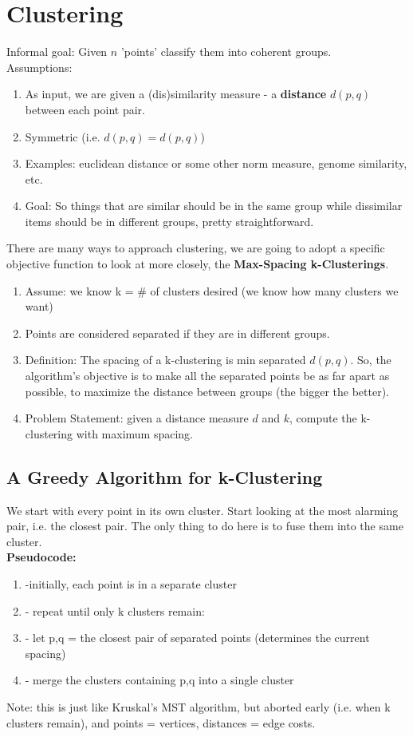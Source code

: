 \documentclass{article}
\begin{document}
\section{Clustering}
Informal goal: Given $n$ 'points' classify them into coherent groups.
\\ 
Assumptions: 
\
\begin{enumerate}
\item As input, we are given a (dis)similarity measure - a \textbf{distance} $d(p,q)$ between each point pair.
\item Symmetric (i.e. $d(p,q) = d(p,q)$)
\item Examples: euclidean distance or some other norm measure, genome similarity, etc.
\item Goal: So things that are similar should be in the same group while dissimilar items should be in different groups, pretty 
straightforward.
\end{enumerate}
There are many ways to approach clustering, we are going to adopt a specific objective function to look at more closely, the 
\textbf{Max-Spacing k-Clusterings}.
\
\begin{enumerate}
\item Assume: we know k = \# of clusters desired (we know how many clusters we want)
\item Points are considered separated if they are in different groups.
\item Definition: The spacing of a k-clustering is min separated $d(p,q)$.  So, the algorithm's objective is to make all the
separated points be as far apart as possible, to maximize the distance between groups (the bigger the better).
\item Problem Statement: given a distance measure $d$ and $k$, compute the k-clustering with maximum spacing.
\end{enumerate}

\subsection{A Greedy Algorithm for k-Clustering}
We start with every point in its own cluster.  Start looking at the most alarming pair, i.e. the closest pair.  The only thing to 
do here is to fuse them into the same cluster. \\
\textbf{Pseudocode:}
\
\begin{enumerate}
  \item -initially, each point is in a separate cluster
\item - repeat until only k clusters remain:
\item - let p,q = the closest pair of separated points (determines the current spacing)
\item - merge the clusters containing p,q into a single cluster
\end{enumerate}
Note: this is just like Kruskal's MST algorithm, but aborted early (i.e. when k clusters remain), and points = vertices,
distances = edge costs.
\end{document}
